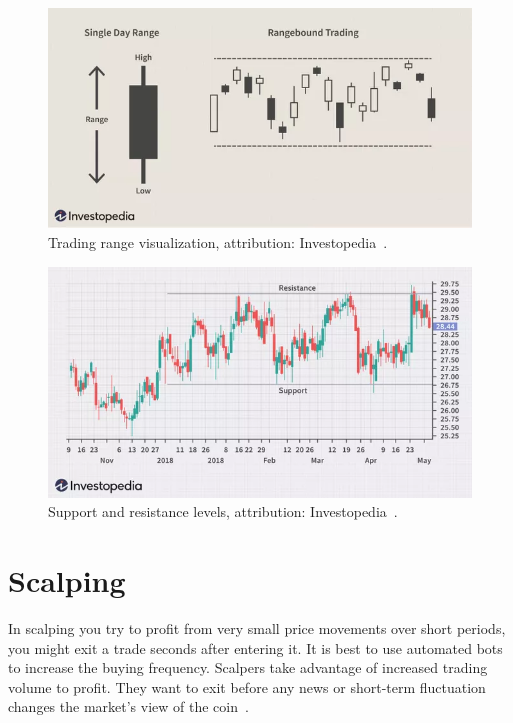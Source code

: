 \begin{figure}[!hbt]
    \centering
    \includegraphics[width=\columnwidth]{figures/trading-range.png}
    \caption{Trading range visualization, attribution: Investopedia~\cite{investopedia:trading-range}.}
    \label{trading-range-figure}
\end{figure}

\begin{figure}[!hbt]
    \centering
    \includegraphics[width=\columnwidth]{figures/dotdash-final-trading-range.png}
    \caption{Support and resistance levels, attribution: Investopedia~\cite{investopedia:trading-range}.}
    \label{sup-and-res-levels}
\end{figure}

\section{Scalping}
\label{section-scalping}
In scalping you try to profit from very small price movements over short periods, you might exit a trade seconds after entering it. It is best to use automated bots to increase the buying frequency. Scalpers take advantage of increased trading volume to profit. They want to exit before any news or short-term fluctuation changes the market's view of the coin~\cite{best-crypto-daytrading}.

